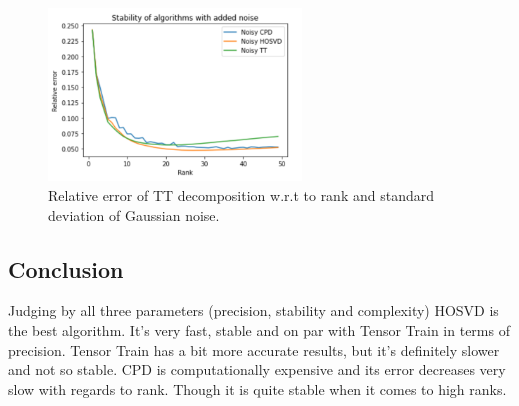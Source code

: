\documentclass[../../main.tex]{subfiles}
\begin{document}
\begin{figure}[h!]
\centering
\includegraphics[width=0.6\textwidth]{figures/stability}
\caption{Relative error of TT decomposition w.r.t to rank and standard deviation of Gaussian noise.}
\label{fig:kotua:7}
\end{figure}

\subsection{Conclusion}
Judging by all three parameters (precision, stability and complexity) HOSVD is the best algorithm. It's very fast, stable and on par with Tensor Train in terms of precision. Tensor Train has a bit more accurate results, but it's definitely slower and not so stable. CPD is computationally expensive and its error decreases very slow with regards to rank. Though it is quite stable when it comes to high ranks.
\end{document}

